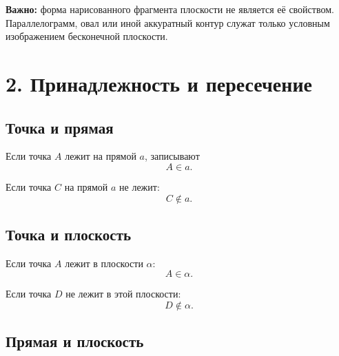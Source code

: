 \documentclass[a4paper,12pt]{article}
\newcommand{\important}[1]{\textbf{\textcolor{darkaccent}{#1}}}
\begin{document}
\begin{center}
\end{center}

\important{Важно:} форма нарисованного фрагмента плоскости не является её свойством. Параллелограмм, овал или иной аккуратный контур служат только условным изображением бесконечной плоскости.


\section*{\textcolor{darkaccent}{2. Принадлежность и пересечение}}

\subsection*{\textcolor{accent}{Точка и прямая}}

Если точка $A$ лежит на прямой $a$, записывают
\[
A\in a.
\]

Если точка $C$ на прямой $a$ не лежит:
\[
C\notin a.
\]

\subsection*{\textcolor{accent}{Точка и плоскость}}

Если точка $A$ лежит в плоскости $\alpha$:
\[
A\in\alpha.
\]

Если точка $D$ не лежит в этой плоскости:
\[
D\notin\alpha.
\]

\subsection*{\textcolor{accent}{Прямая и плоскость}}
\end{document}
